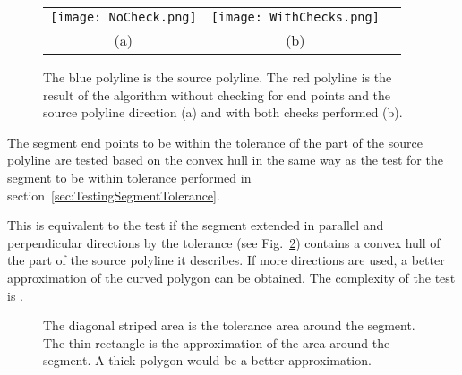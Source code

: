 \documentclass[conference]{IEEEtran}
\begin{document}
\begin{figure} [hb]
  \centering
  \begin{tabular}{c c c}
    \texttt{[image: NoCheck.png]} &
    \texttt{[image: WithChecks.png]} \\
    (a) &
    (b)
  \end{tabular}
  \caption
  {
    The blue polyline is the source polyline. The red polyline is the result of the algorithm without checking for end points and the source polyline direction (a) and with both checks performed (b).
  }
  \label{fig:TopologycalTest}
\end{figure}

The segment end points to be within the tolerance of the part of the source polyline are tested based on the convex hull in the same way as the test for the segment to be within tolerance performed in section~\ref{sec:TestingSegmentTolerance}.

This is equivalent to the test if the segment extended in parallel and perpendicular directions by the tolerance (see Fig.~\ref{fig:SegmentEndPoints}) contains a convex hull of the part of the source polyline it describes. If more directions are used, a better approximation of the curved polygon can be obtained. The complexity of the test is .

\begin{figure} [htb]
  \centering
  \caption
  {
    The diagonal striped area is the tolerance area around the segment. The thin rectangle is the approximation of the area around the segment. A thick polygon would be a better approximation.
  }
  \label{fig:SegmentEndPoints}
\end{figure}
\end{document}
